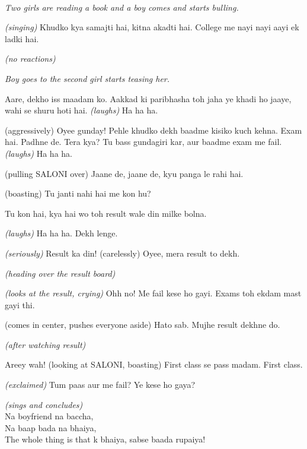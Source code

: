 \documentclass[12pt,a4paper,oneside]{memoir}
\begin{document}
\begin{description}[itemsep=1ex,leftmargin=1cm]
\setlength{\parskip}{5pt}

\item[] \hfill \\
\textit{Two girls are reading a book and a boy comes and starts bulling.}

\item[VIJAAN] \textit{(singing)} Khudko kya samajti hai, kitna akadti hai. College me nayi nayi aayi ek ladki hai.

\item[RIYA] \textit{(no reactions)}

\textit{Boy goes to the second girl starts teasing her.}

\item[VIJAAN] Aare, dekho iss maadam ko. Aakkad ki paribhasha toh jaha ye khadi ho jaaye, wahi se shuru hoti hai. \textit{(laughs)} Ha ha ha.

\item[SALONI] (aggressively) Oyee gunday! Pehle khudko dekh baadme kisiko kuch kehna. Exam hai. Padhne de. Tera kya? Tu bass gundagiri kar, aur baadme exam me fail. \textit{(laughs)} Ha ha ha.

\item[RIYA] (pulling SALONI over) Jaane de, jaane de, kyu panga le rahi hai.

\item[VIJAAN] (boasting) Tu janti nahi hai me kon hu?

\item[SALONI] Tu kon hai, kya hai wo toh result wale din milke bolna.

\item[VIJAAN] \textit{(laughs)} Ha ha ha. Dekh lenge.

\item[BHARGAV] \textit{(seriously)} Result ka din! (carelessly) Oyee, mera result to dekh.

\item[ALL] \textit{(heading over the result board)}

\item[SALONI] \textit{(looks at the result, crying)} Ohh no! Me fail kese ho gayi. Exams toh ekdam mast gayi thi.

\item[VIJAAN] (comes in center, pushes everyone aside) Hato sab. Mujhe result dekhne do.

\textit{(after watching result)} 

\item[VIJAAN] Areey wah! (looking at SALONI, boasting) First class se pass madam. First class.

\item[SALONI] \textit{(exclaimed)} Tum paas aur me fail? Ye kese ho gaya?

\item[VIJAAN] \textit{(sings and concludes)} \\
Na boyfriend na baccha, \\
Na baap bada na bhaiya, \\
The whole thing is that k bhaiya, sabse baada rupaiya!

\end{description}
\vskip 1cm
\end{document}

